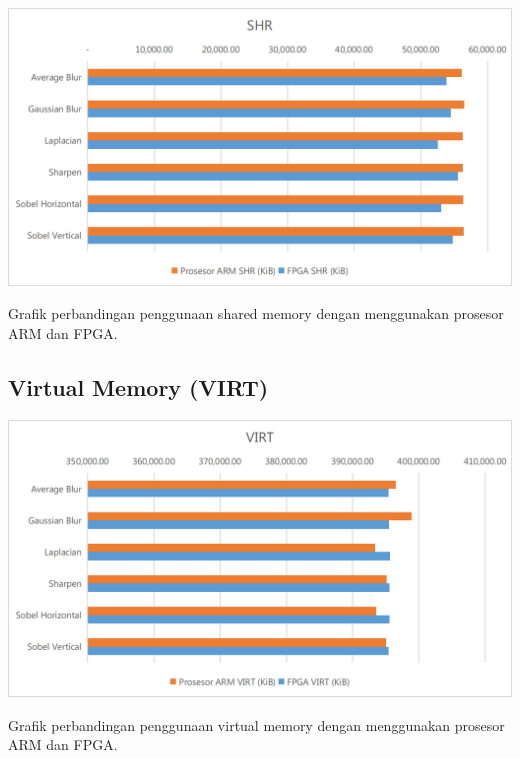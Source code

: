 \begin{afigure}
    \includegraphics[width=0.9\linewidth, center]{images/chart/chart-shr.png}
    \caption{Grafik perbandingan penggunaan shared memory dengan menggunakan prosesor ARM dan FPGA.}
    \label{fig:chart-shr}
\end{afigure}

\subsection{Virtual Memory (VIRT)}
\blindtext

\begin{afigure}
    \includegraphics[width=0.9\linewidth, center]{images/chart/chart-virt.png}
    \caption{Grafik perbandingan penggunaan virtual memory dengan menggunakan prosesor ARM dan FPGA.}
    \label{fig:chart-virt}
\end{afigure}